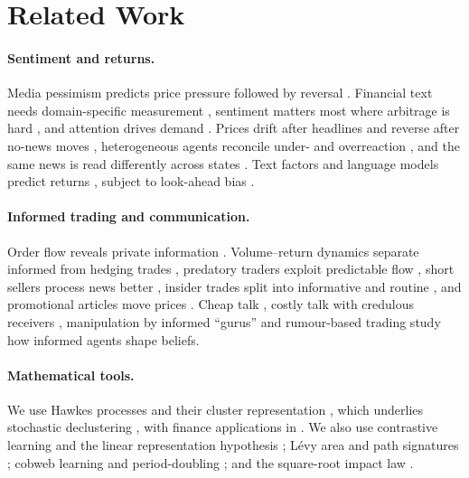 \documentclass{article}
\theoremstyle{plain}
\theoremstyle{definition}
\theoremstyle{remark}
\begin{document}
\section{Related Work}\label{sec:related}

\paragraph{Sentiment and returns.} Media pessimism predicts price pressure followed by reversal \citep{tetlock2007}. Financial text needs domain-specific measurement \citep{loughran2011}, sentiment matters most where arbitrage is hard \citep{baker2006,shleifer1997,delong1990}, and attention drives demand \citep{barber2008,da2011}. Prices drift after headlines and reverse after no-news moves \citep{chan2003}, heterogeneous agents reconcile under- and overreaction \citep{hong1999}, and the same news is read differently across states \citep{veronesi1999}. Text factors and language models predict returns \citep{ke2019,araci2019,lopezlira2023}, subject to look-ahead bias \citep{glasserman2023}.

\paragraph{Informed trading and communication.} Order flow reveals private information \citep{kyle1985,glosten1985}. Volume--return dynamics separate informed from hedging trades \citep{llorente2002}, predatory traders exploit predictable flow \citep{brunnermeier2005}, short sellers process news better \citep{engelberg2012}, insider trades split into informative and routine \citep{cohen2012}, and promotional articles move prices \citep{kogan2023}. Cheap talk \citep{crawford1982}, costly talk with credulous receivers \citep{kartik2007}, manipulation by informed ``gurus'' \citep{benabou1992} and rumour-based trading \citep{vanbommel2003} study how informed agents shape beliefs.

\paragraph{Mathematical tools.} We use Hawkes processes \citep{hawkes1971} and their cluster representation \citep{hawkesoakes1974}, which underlies stochastic declustering \citep{zhuang2002}, with finance applications in \citep{bacry2015}. We also use contrastive learning \citep{oord2018,reimers2019} and the linear representation hypothesis \citep{park2023}; L\'evy area and path signatures \citep{levy1940,lyons1998,chevyrev2016}; cobweb learning and period-doubling \citep{ezekiel1938,evans2001,may1976}; and the square-root impact law \citep{bouchaud2018}.
\end{document}
